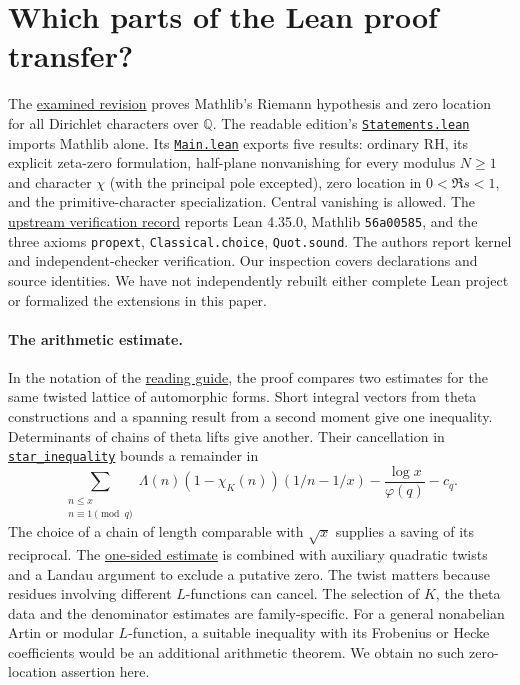 \documentclass[11pt,letterpaper]{article}
\newcommand{\upfile}[2]{\href{https://github.com/lsernau/grh-lean/blob/72fead102f663d5c7a407964a13dc0cf9d977207/#1}{#2}}
\begin{document}
\section{Which parts of the Lean proof transfer?}
The \href{https://github.com/lsernau/grh-lean/tree/72fead102f663d5c7a407964a13dc0cf9d977207}{examined revision} proves Mathlib's Riemann hypothesis and zero location for all Dirichlet characters over $\mathbb Q$. The readable edition's \upfile{grh/src/Statements.lean}{\texttt{Statements.lean}} imports Mathlib alone. Its \upfile{grh/src/Main.lean}{\texttt{Main.lean}} exports five results: ordinary RH, its explicit zeta-zero formulation, half-plane nonvanishing for every modulus $N\ge1$ and character $\chi$ (with the principal pole excepted), zero location in $0<\Re s<1$, and the primitive-character specialization. Central vanishing is allowed. The \upfile{grh/README.md}{upstream verification record} reports Lean 4.35.0, Mathlib \texttt{56a00585}, and the three axioms \texttt{propext}, \texttt{Classical.choice}, \texttt{Quot.sound}. The authors report kernel and independent-checker verification. Our inspection covers declarations and source identities. We have not independently rebuilt either complete Lean project or formalized the extensions in this paper.

\paragraph{The arithmetic estimate.}
In the notation of the \upfile{grh/GUIDE.md}{reading guide}, the proof compares two estimates for the same twisted lattice of automorphic forms. Short integral vectors from theta constructions and a spanning result from a second moment give one inequality. Determinants of chains of theta lifts give another. Their cancellation in \upfile{grh/src/New/Reduction/MainInequality.lean}{\texttt{star\_inequality}} bounds a remainder in
\[
 \sum_{\substack{n\le x\\n\equiv1\pmod q}}\Lambda(n)(1-\chi_K(n))
            (1/n-1/x)-\frac{\log x}{\varphi(q)}-c_q.
\]
The choice of a chain of length comparable with $\sqrt x$ supplies a saving of its reciprocal. The \upfile{grh/src/New/Reduction/OneSidedBound.lean}{one-sided estimate} is combined with auxiliary quadratic twists and a Landau argument to exclude a putative zero. The twist matters because residues involving different $L$-functions can cancel. The selection of $K$, the theta data and the denominator estimates are family-specific. For a general nonabelian Artin or modular $L$-function, a suitable inequality with its Frobenius or Hecke coefficients would be an additional arithmetic theorem. We obtain no such zero-location assertion here.
\end{document}
